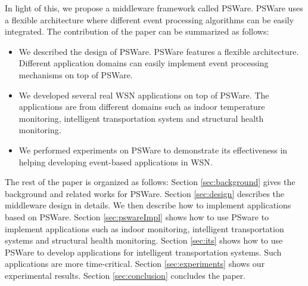  
In light of this, we propose a middleware framework called PSWare. PSWare uses a flexible architecture where different event processing algorithms can be easily integrated. The contribution of the paper can be summarized as follows:
\begin{itemize}
\item We described the design of PSWare. PSWare features a flexible architecture. Different application domains can easily implement event processing mechanisms on top of PSWare.
\item We developed several real WSN applications on top of PSWare. The applications are from different domains such as indoor temperature monitoring, intelligent transportation system and structural health monitoring.
\item We performed experiments on PSWare to demonstrate its effectiveness in helping developing event-based applications in WSN.
\end{itemize}

The rest of the paper is organized as follows: Section \ref{sec:background} gives the background and related works for PSWare. Section \ref{sec:design} describes the middleware design in details. We then describe how to implement applications based on PSWare. Section \ref{sec:pswareImpl} shows how to use PSware to implement applications such as indoor monitoring, intelligent transportation systems and structural health monitoring. Section \ref{sec:its} shows how to use PSWare to develop applications for intelligent transportation systems. Such applications are more time-critical. Section \ref{sec:experiments} shows our experimental results. Section \ref{sec:conclusion} concludes the paper.